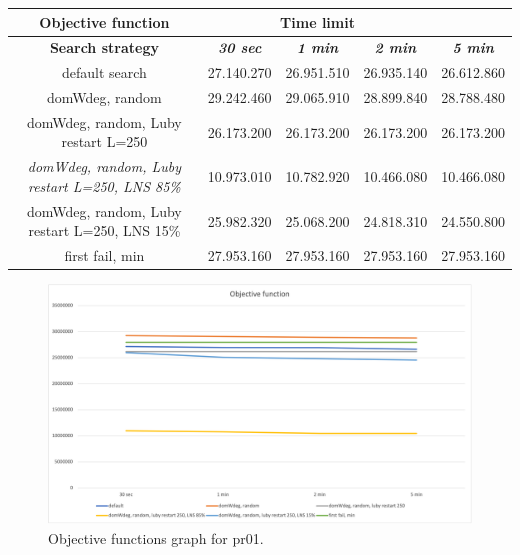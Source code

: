 {
\renewcommand{\arraystretch}{2}
\begin{longtable}[h]{| c | c | c | c | c |}
    \hline
    \textbf{Objective function} & \multicolumn{3}{c}{Time limit} & \\
    \hline
    \textbf{Search strategy} & \textbf{\textit{30 sec}} & \textbf{\textit{1 min}} & \textbf{\textit{2 min}} & \textbf{\textit{5 min}} \\
    \hline
    \endhead
    default search                                         & 27.140.270 & 26.951.510 & 26.935.140 & 26.612.860 \\
    \hline
    domWdeg, random                                        & 29.242.460 & 29.065.910 & 28.899.840 & 28.788.480 \\
    \hline
    domWdeg, random, Luby restart L=250                    & 26.173.200 & 26.173.200 & 26.173.200 & 26.173.200 \\
    \hline
    \textit{domWdeg, random, Luby restart L=250, LNS 85\%} & 10.973.010 & 10.782.920 & 10.466.080 & 10.466.080 \\
    \hline
    domWdeg, random, Luby restart L=250, LNS 15\%          & 25.982.320 & 25.068.200 & 24.818.310 & 24.550.800 \\
    \hline
    first fail, min                                        & 27.953.160 & 27.953.160 & 27.953.160 & 27.953.160 \\
    \hline
\end{longtable}
}
\begin{figure}[H]
    \centering
    \includegraphics[width=1.0\columnwidth]{../graphs/pr01-objf.png}
    \caption{Objective functions graph for pr01.}
\end{figure}

